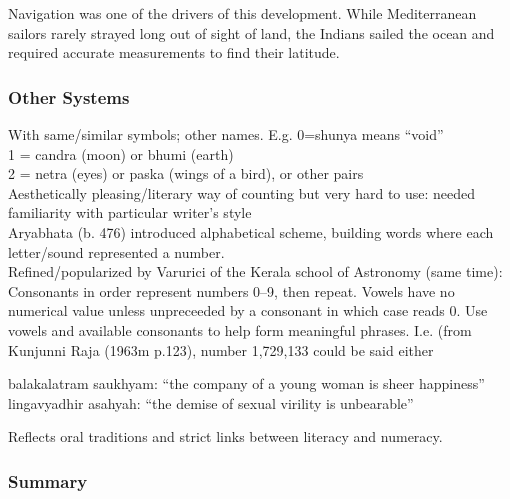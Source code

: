 Navigation was one of the drivers of this development. While Mediterranean sailors rarely strayed long out of sight of land, the Indians sailed the ocean and required accurate measurements to find their latitude.

\iffalse
\subsubsection*{Other Systems}

With same/similar symbols; other names. E.g. 0=shunya means ``void''\\
1 = candra (moon) or bhumi (earth)\\
2 = netra (eyes) or paska (wings of a bird), or other pairs\\
Aesthetically pleasing/literary way of counting but very hard to use: needed familiarity with particular writer's style\\

Aryabhata (b. 476) introduced alphabetical scheme, building words where each letter/sound represented a number.\\
Refined/popularized by Varurici of the Kerala school of Astronomy (same time):\\
Consonants in order represent numbers 0--9, then repeat. Vowels have no numerical value unless unpreceeded by a consonant in which case reads 0. Use vowels and available consonants to help form meaningful phrases. I.e. (from Kunjunni Raja (1963m p.123), number 1,729,133 could be said either
\begin{center}
balakalatram saukhyam: ``the company of a young woman is sheer happiness''\\
lingavyadhir asahyah: ``the demise of sexual virility is unbearable''
\end{center}

Reflects oral traditions and strict links between literacy and numeracy.





\subsubsection*{Summary}


